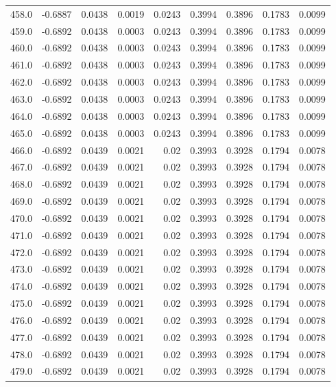 \begin{longtable}{lrrrrrrrr}
458.0 & -0.6887 & 0.0438 & 0.0019 & 0.0243 & 0.3994 & 0.3896 & 0.1783 & 0.0099 \\
459.0 & -0.6892 & 0.0438 & 0.0003 & 0.0243 & 0.3994 & 0.3896 & 0.1783 & 0.0099 \\
460.0 & -0.6892 & 0.0438 & 0.0003 & 0.0243 & 0.3994 & 0.3896 & 0.1783 & 0.0099 \\
461.0 & -0.6892 & 0.0438 & 0.0003 & 0.0243 & 0.3994 & 0.3896 & 0.1783 & 0.0099 \\
462.0 & -0.6892 & 0.0438 & 0.0003 & 0.0243 & 0.3994 & 0.3896 & 0.1783 & 0.0099 \\
463.0 & -0.6892 & 0.0438 & 0.0003 & 0.0243 & 0.3994 & 0.3896 & 0.1783 & 0.0099 \\
464.0 & -0.6892 & 0.0438 & 0.0003 & 0.0243 & 0.3994 & 0.3896 & 0.1783 & 0.0099 \\
465.0 & -0.6892 & 0.0438 & 0.0003 & 0.0243 & 0.3994 & 0.3896 & 0.1783 & 0.0099 \\
466.0 & -0.6892 & 0.0439 & 0.0021 & 0.02 & 0.3993 & 0.3928 & 0.1794 & 0.0078 \\
467.0 & -0.6892 & 0.0439 & 0.0021 & 0.02 & 0.3993 & 0.3928 & 0.1794 & 0.0078 \\
468.0 & -0.6892 & 0.0439 & 0.0021 & 0.02 & 0.3993 & 0.3928 & 0.1794 & 0.0078 \\
469.0 & -0.6892 & 0.0439 & 0.0021 & 0.02 & 0.3993 & 0.3928 & 0.1794 & 0.0078 \\
470.0 & -0.6892 & 0.0439 & 0.0021 & 0.02 & 0.3993 & 0.3928 & 0.1794 & 0.0078 \\
471.0 & -0.6892 & 0.0439 & 0.0021 & 0.02 & 0.3993 & 0.3928 & 0.1794 & 0.0078 \\
472.0 & -0.6892 & 0.0439 & 0.0021 & 0.02 & 0.3993 & 0.3928 & 0.1794 & 0.0078 \\
473.0 & -0.6892 & 0.0439 & 0.0021 & 0.02 & 0.3993 & 0.3928 & 0.1794 & 0.0078 \\
474.0 & -0.6892 & 0.0439 & 0.0021 & 0.02 & 0.3993 & 0.3928 & 0.1794 & 0.0078 \\
475.0 & -0.6892 & 0.0439 & 0.0021 & 0.02 & 0.3993 & 0.3928 & 0.1794 & 0.0078 \\
476.0 & -0.6892 & 0.0439 & 0.0021 & 0.02 & 0.3993 & 0.3928 & 0.1794 & 0.0078 \\
477.0 & -0.6892 & 0.0439 & 0.0021 & 0.02 & 0.3993 & 0.3928 & 0.1794 & 0.0078 \\
478.0 & -0.6892 & 0.0439 & 0.0021 & 0.02 & 0.3993 & 0.3928 & 0.1794 & 0.0078 \\
479.0 & -0.6892 & 0.0439 & 0.0021 & 0.02 & 0.3993 & 0.3928 & 0.1794 & 0.0078 \\

\end{longtable}
